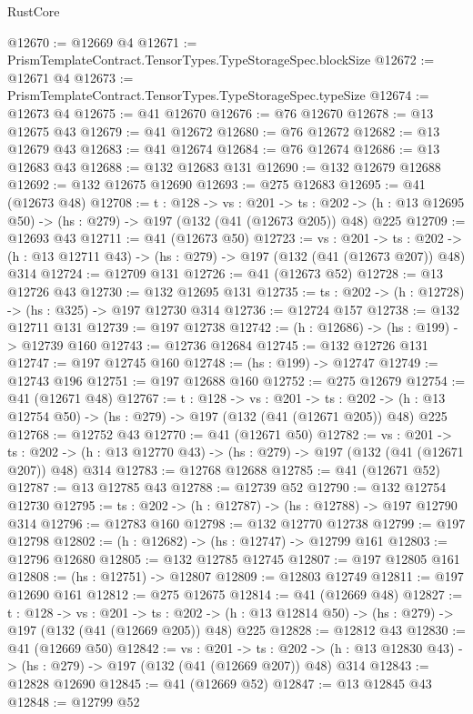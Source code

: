 \begin{lexlean}{RustCore}
\begin{coremodule}
@12670 := @12669 @4
@12671 := PrismTemplateContract.TensorTypes.TypeStorageSpec.blockSize
@12672 := @12671 @4
@12673 := PrismTemplateContract.TensorTypes.TypeStorageSpec.typeSize
@12674 := @12673 @4
@12675 := @41 @12670
@12676 := @76 @12670
@12678 := @13 @12675 @43
@12679 := @41 @12672
@12680 := @76 @12672
@12682 := @13 @12679 @43
@12683 := @41 @12674
@12684 := @76 @12674
@12686 := @13 @12683 @43
@12688 := @132 @12683 @131
@12690 := @132 @12679 @12688
@12692 := @132 @12675 @12690
@12693 := @275 @12683
@12695 := @41 (@12673 @48)
@12708 := {t : @128} ->
  {vs : @201} ->
  {ts : @202} -> (h : @13 @12695 @50) -> (hs : @279) -> @197 (@132 (@41 (@12673 @205)) @48) @225
@12709 := @12693 @43
@12711 := @41 (@12673 @50)
@12723 := {vs : @201} ->
  {ts : @202} -> (h : @13 @12711 @43) -> (hs : @279) -> @197 (@132 (@41 (@12673 @207)) @48) @314
@12724 := @12709 @131
@12726 := @41 (@12673 @52)
@12728 := @13 @12726 @43
@12730 := @132 @12695 @131
@12735 := {ts : @202} -> (h : @12728) -> (hs : @325) -> @197 @12730 @314
@12736 := @12724 @157
@12738 := @132 @12711 @131
@12739 := @197 @12738
@12742 := (h : @12686) -> (hs : @199) -> @12739 @160
@12743 := @12736 @12684
@12745 := @132 @12726 @131
@12747 := @197 @12745 @160
@12748 := (hs : @199) -> @12747
@12749 := @12743 @196
@12751 := @197 @12688 @160
@12752 := @275 @12679
@12754 := @41 (@12671 @48)
@12767 := {t : @128} ->
  {vs : @201} ->
  {ts : @202} -> (h : @13 @12754 @50) -> (hs : @279) -> @197 (@132 (@41 (@12671 @205)) @48) @225
@12768 := @12752 @43
@12770 := @41 (@12671 @50)
@12782 := {vs : @201} ->
  {ts : @202} -> (h : @13 @12770 @43) -> (hs : @279) -> @197 (@132 (@41 (@12671 @207)) @48) @314
@12783 := @12768 @12688
@12785 := @41 (@12671 @52)
@12787 := @13 @12785 @43
@12788 := @12739 @52
@12790 := @132 @12754 @12730
@12795 := {ts : @202} -> (h : @12787) -> (hs : @12788) -> @197 @12790 @314
@12796 := @12783 @160
@12798 := @132 @12770 @12738
@12799 := @197 @12798
@12802 := (h : @12682) -> (hs : @12747) -> @12799 @161
@12803 := @12796 @12680
@12805 := @132 @12785 @12745
@12807 := @197 @12805 @161
@12808 := (hs : @12751) -> @12807
@12809 := @12803 @12749
@12811 := @197 @12690 @161
@12812 := @275 @12675
@12814 := @41 (@12669 @48)
@12827 := {t : @128} ->
  {vs : @201} ->
  {ts : @202} -> (h : @13 @12814 @50) -> (hs : @279) -> @197 (@132 (@41 (@12669 @205)) @48) @225
@12828 := @12812 @43
@12830 := @41 (@12669 @50)
@12842 := {vs : @201} ->
  {ts : @202} -> (h : @13 @12830 @43) -> (hs : @279) -> @197 (@132 (@41 (@12669 @207)) @48) @314
@12843 := @12828 @12690
@12845 := @41 (@12669 @52)
@12847 := @13 @12845 @43
@12848 := @12799 @52

\end{coremodule}
\end{lexlean}
